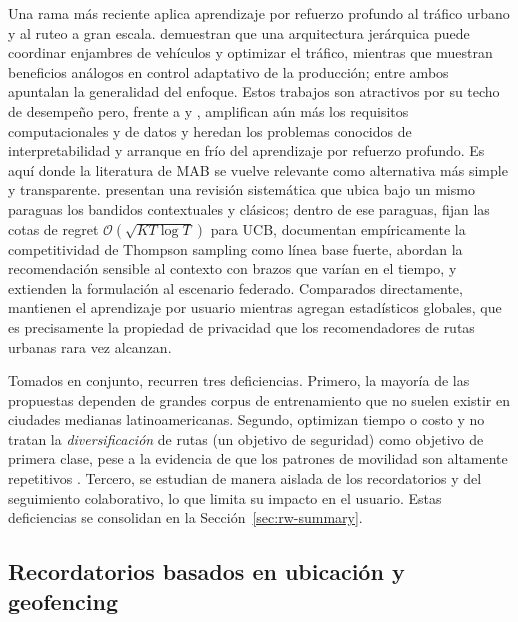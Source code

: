\documentclass[a4paper,fleqn]{cas-sc}
\newcommand{\UCB}{UCB\xspace}
\newcommand{\MAB}{MAB\xspace}
\begin{document}
	Una rama m\'as reciente aplica aprendizaje por refuerzo profundo al tr\'afico urbano y al ruteo a gran escala. \citet{zhang2025drlnavigation} demuestran que una arquitectura jer\'arquica puede coordinar enjambres de veh\'iculos y optimizar el tr\'afico, mientras que \citet{kuhnle2021rl} muestran beneficios an\'alogos en control adaptativo de la producci\'on; entre ambos apuntalan la generalidad del enfoque. Estos trabajos son atractivos por su techo de desempe\~no pero, frente a \citet{campigotto2017favour} y \citet{guo2021online}, amplifican a\'un m\'as los requisitos computacionales y de datos y heredan los problemas conocidos de interpretabilidad y arranque en fr\'io del aprendizaje por refuerzo profundo. Es aqu\'i donde la literatura de \MAB se vuelve relevante como alternativa m\'as simple y transparente. \citet{bouneffouf2020mabsurvey} presentan una revisi\'on sistem\'atica que ubica bajo un mismo paraguas los bandidos contextuales y cl\'asicos; dentro de ese paraguas, \citet{auer2002ucb} fijan las cotas de regret $\mathcal{O}(\sqrt{KT\log T})$ para \UCB, \citet{chapelle2011thompson} documentan emp\'iricamente la competitividad de Thompson sampling como l\'inea base fuerte, \citet{zeng2016mab} abordan la recomendaci\'on sensible al contexto con brazos que var\'ian en el tiempo, y \citet{shi2021fedmab} extienden la formulaci\'on al escenario federado. Comparados directamente, \citet{shi2021fedmab} mantienen el aprendizaje por usuario mientras agregan estad\'isticos globales, que es precisamente la propiedad de privacidad que los recomendadores de rutas urbanas rara vez alcanzan.
	
	Tomados en conjunto, recurren tres deficiencias. Primero, la mayor\'ia de las propuestas dependen de grandes corpus de entrenamiento que no suelen existir en ciudades medianas latinoamericanas. Segundo, optimizan tiempo o costo y no tratan la \emph{diversificaci\'on} de rutas (un objetivo de seguridad) como objetivo de primera clase, pese a la evidencia de que los patrones de movilidad son altamente repetitivos \citep{song2010predictability,cagney2025urban,liu2022route}. Tercero, se estudian de manera aislada de los recordatorios y del seguimiento colaborativo, lo que limita su impacto en el usuario. Estas deficiencias se consolidan en la Secci\'on~\ref{sec:rw-summary}.
	
	\subsection{Recordatorios basados en ubicaci\'on y geofencing}\label{sec:rw-reminders}
	
\end{document}
